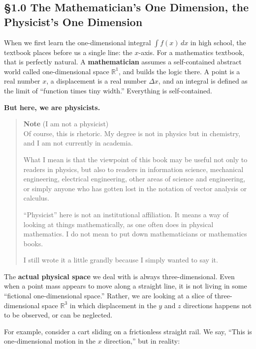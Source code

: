 \documentclass[a4paper,12pt,openany]{book}
\begin{document}
\hypertarget{the-mathematicians-one-dimension-the-physicists-one-dimension}{%
\subsection{§1.0 The Mathematician's One Dimension, the Physicist's One
Dimension}\label{the-mathematicians-one-dimension-the-physicists-one-dimension}}

When we first learn the one-dimensional integral \(\int f(x)\,dx\) in
high school, the textbook places before us a single line: the
\(x\)-axis. For a mathematics textbook, that is perfectly natural. A
\textbf{mathematician} assumes a self-contained abstract world called
one-dimensional space \(\mathbb{R}^1\), and builds the logic there. A
point is a real number \(x\), a displacement is a real number
\(\Delta x\), and an integral is defined as the limit of ``function
times tiny width.'' Everything is self-contained.

\textbf{But here, we are physicists.}

\begin{quote}
\textbf{Note} (I am not a physicist)\\
Of course, this is rhetoric. My degree is not in physics but in
chemistry, and I am not currently in academia.

What I mean is that the viewpoint of this book may be useful not only to
readers in physics, but also to readers in information science,
mechanical engineering, electrical engineering, other areas of science
and engineering, or simply anyone who has gotten lost in the notation of
vector analysis or calculus.

``Physicist'' here is not an institutional affiliation. It means a way
of looking at things mathematically, as one often does in physical
mathematics. I do not mean to put down mathematicians or mathematics
books.

I still wrote it a little grandly because I simply wanted to say it.
\end{quote}

The \textbf{actual physical space} we deal with is always
three-dimensional. Even when a point mass appears to move along a
straight line, it is not living in some ``fictional one-dimensional
space.'' Rather, we are looking at a slice of three-dimensional space
\(\mathbb{R}^3\) in which displacement in the \(y\) and \(z\) directions
happens not to be observed, or can be neglected.

For example, consider a cart sliding on a frictionless straight rail. We
say, ``This is one-dimensional motion in the \(x\) direction,'' but in
reality:
\end{document}
